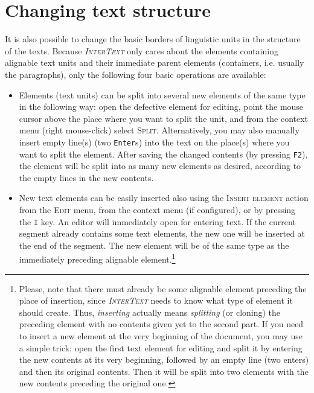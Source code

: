 \documentclass[a4paper,10pt,oneside]{book}
\newcommand{\IT}{\textit{\textsc{InterText}}\xspace}
\newcommand{\keys}[1]{\texttt{#1}}
\newcommand{\menu}[1]{\textsc{#1}}
\begin{document}
\section{Changing text structure}\label{ch:howto:edit_struc}

It is also possible to change the basic borders of linguistic units in the structure of the texts. Because \IT only cares about the elements containing alignable text units and their immediate parent elements (containers, i.e. usually the paragraphs), only the following four basic operations are available:

\begin{itemize}
 \item Elements (text units) can be split into several new elements of the same type in the following way: open the defective element for editing, point the mouse cursor above the place where you want to split the unit, and from the context menu (right mouse-click) select \menu{Split}. Alternatively, you may also manually insert empty line(s) (two \keys{Enter}s) into the text on the place(s) where you want to split the element. After saving the changed contents (by pressing \keys{F2}), the element will be split into as many new elements as desired, according to the empty lines in the new contents.
 \item New text elements can be easily inserted also using the \menu{Insert element} action from the \menu{Edit} menu, from the context menu (if configured), or by pressing the \keys{I} key. An editor will immediately open for entering text. If the current segment already contains some text elements, the new one will be inserted at the end of the segment. The new element will be of the same type as the immediately preceding alignable element.\footnote{Please, note that there must already be some alignable element preceding the place of insertion, since \IT needs to know what type of element it should create. Thus, \emph{inserting} actually means \emph{splitting} (or cloning) the preceding element with no contents given yet to the second part. If you need to insert a new element at the very beginning of the document, you may use a simple trick: open the first text element for editing and split it by entering the new contents at its very beginning, followed by an empty line (two enters) and then its original contents. Then it will be split into two elements with the new contents preceding the original one.}

\end{itemize}
\end{document}
